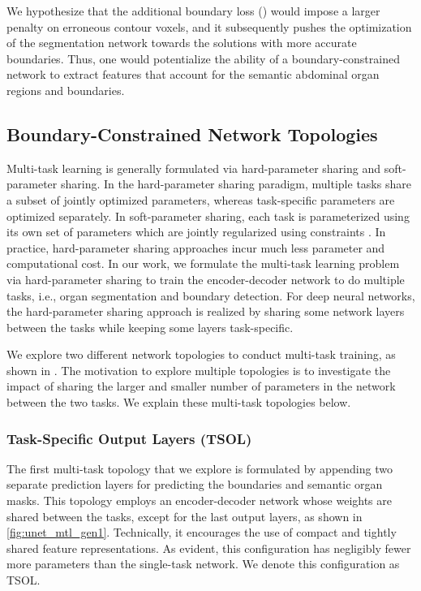 \documentclass[final,5p,times,twocolumn]{elsarticle}
\begin{document}
We hypothesize that the additional boundary loss () would impose a larger penalty on erroneous contour voxels, and it subsequently pushes the optimization of the segmentation network towards the solutions with more accurate boundaries. Thus, one would potentialize the ability of a boundary-constrained network to extract features that account for the semantic abdominal organ regions and boundaries. 
\subsection{Boundary-Constrained Network Topologies}\label{sec:topo}
Multi-task learning is generally formulated via hard-parameter sharing and soft-parameter sharing. In the hard-parameter sharing paradigm, multiple tasks share a subset of jointly optimized parameters, whereas task-specific parameters are optimized separately. In soft-parameter sharing, each task is parameterized using its own set of parameters which are jointly regularized using constraints \cite{Ruder2017AnOO}. In practice, hard-parameter sharing approaches incur much less parameter and computational cost. In our work, we formulate the multi-task learning problem via hard-parameter sharing to train the encoder-decoder network to do multiple tasks, i.e., organ segmentation and boundary detection. For deep neural networks, the hard-parameter sharing approach is realized by sharing some network layers between the tasks while keeping some layers task-specific.  

We explore two different network topologies to conduct multi-task training, as shown in . The motivation to explore multiple topologies is to investigate the impact of sharing the larger and smaller number of parameters in the network between the two tasks. We explain these multi-task topologies below.
\subsubsection{Task-Specific Output Layers (TSOL)}\label{sec:tsl}
The first multi-task topology that we explore is formulated by appending two separate prediction layers for predicting the boundaries and semantic organ masks. This topology employs an encoder-decoder network whose weights are shared between the tasks, except for the last output layers, as shown in \autoref{fig:unet_mtl_gen1}. Technically, it encourages the use of compact and tightly shared feature representations. As evident, this configuration has negligibly fewer more parameters than the single-task network. We denote this configuration as TSOL. 
\end{document}
